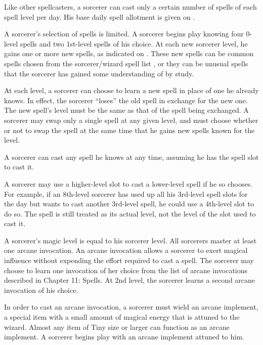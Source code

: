 \par Like other spellcasters, a sorcerer can cast only a certain number
of spells of each spell level per day. His base daily spell allotment is
given on .

\par A sorcerer's selection of spells is limited. A sorcerer
begins play knowing four 0-level spells and two
1st-level spells of his choice. At each new sorcerer level, he gains
one or more new spells, as indicated on . These new spells can be common spells chosen from
the sorcerer/wizard spell list , or they can be unusual
spells that the sorcerer has gained some understanding of by study.

\par At each level, a sorcerer can choose to learn a
new spell in place of one he already knows. In effect, the sorcerer
``loses'' the old spell in exchange for the new one. The new spell's
level must be the same as that of the spell being exchanged. A sorcerer may swap only a single
spell at any given level, and must choose whether or not to swap the
spell at the same time that he gains new spells known for the level.

\par A sorcerer can cast any spell he knows at any time, assuming he has the spell slot to cast it.

\par A sorcerer may use a higher-level slot to cast a lower-level spell if he so chooses. For example, if an 8th-level sorcerer has used up all his 3rd-level spell slots for the day but wants to cast another 3rd-level spell, he could use a 4th-level slot to do so. The spell is still treated as its actual level, not the level of the slot used to cast it.

A sorcerer's magic level is equal to his sorcerer level.
 All sorcerers master at least one arcane invocation. An arcane invocation allows a sorcerer to exert magical influence without expending the effort required to cast a spell. The sorcerer may choose to learn one invocation of her choice from the list of arcane invocations described in Chapter 11: Spells. At 2nd level, the sorcerer learns a second arcane invocation of his choice.

In order to cast an arcane invocation, a sorcerer must wield an arcane implement, a special item with a small amount of magical energy that is attuned to the wizard. Almost any item of Tiny size or larger can function as an arcane implement. A sorcerer begins play with an arcane implement attuned to him.

